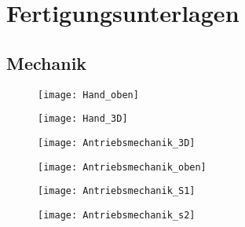 \documentclass[titlepage,12pt,twoside]{article}
\begin{document}
\section{Fertigungsunterlagen}
\label{chap:Fertigungsunterlagen}
\subsection{Mechanik}
\label{chap:Fertigungsunterlagen_Mechanik}
\begin{figure}[H]
	\begin{center}
		\scalebox{1.45}
		{\texttt{[image: Hand\_oben]}}
		\label{fig:Hand_oben}		
	\end{center}
\end{figure}
\hfill \break
\begin{figure}[H]
	\begin{center}
		\scalebox{1.55}
		{\texttt{[image: Hand\_3D]}}
		\label{fig:Hand_3D}		
	\end{center}
\end{figure}
\begin{figure}[H]
	\begin{center}
		\scalebox{1.6}
		{\texttt{[image: Antriebsmechanik\_3D]}}
		\label{fig:Antriebsmechanik_3D}		
	\end{center}
\end{figure}
\begin{figure}[H]
	\begin{center}
		\scalebox{1.55}
		{\texttt{[image: Antriebsmechanik\_oben]}}
		\label{fig:Antriebsmechanik_oben}		
	\end{center}
\end{figure}
\begin{figure}[H]
	\begin{center}
		\scalebox{1.6}
		{\texttt{[image: Antriebsmechanik\_S1]}}
		\label{fig:Antriebsmechanik_S1}		
	\end{center}
\end{figure}
\newpage
\begin{figure}[H]
	\begin{center}
		\scalebox{1.6}
		{\texttt{[image: Antriebsmechanik\_s2]}}
		\label{fig:Antriebsmechanik_s2}		
	\end{center}
\end{figure}
\end{document}

